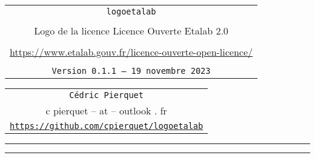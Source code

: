 \documentclass[french,11pt,a4paper]{article}
\def\TPversion{0.1.1}
\def\TPdate{19 novembre 2023}
\begin{document}
\pagestyle{fancy}

\thispagestyle{empty}

\begin{center}
	\begin{minipage}{0.88\linewidth}
	\begin{tcolorbox}[colframe=yellow,colback=yellow!15]
		\begin{center}
			\begin{tabular}{c}
				{\Huge \texttt{logoetalab}}\\
				\\
				{\LARGE Logo de la licence \og Licence Ouverte Etalab 2.0 \fg} \\
				\\
				\url{https://www.etalab.gouv.fr/licence-ouverte-open-licence/} \\
				\\
				{\small \texttt{Version \TPversion{} -- \TPdate}}
		\end{tabular}
		\end{center}
	\end{tcolorbox}
\end{minipage}
\end{center}

\begin{center}
	\begin{tabular}{c}
	\texttt{Cédric Pierquet}\\
	{\ttfamily c pierquet -- at -- outlook . fr}\\
	\texttt{\url{https://github.com/cpierquet/logoetalab}}
\end{tabular}
\end{center}

\hrule


\hypertarget{matoc}{}

\tableofcontents

\vspace*{5mm}

\hrule

\vspace*{5mm}

\vfill
\end{document}
